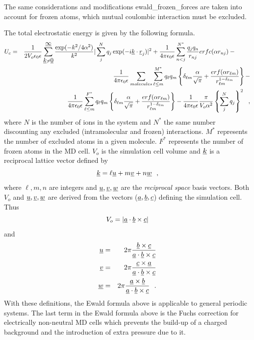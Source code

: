 The same considerations and modifications {\sc
ewald\_frozen\_forces} are taken into account for frozen atoms,
which mutual coulombic interaction must be excluded.

The total electrostatic energy is given by the following formula.
\begin{eqnarray}
U_{c}&=&\frac{1}{2V_{o} \epsilon_{0}\epsilon} \sum_{\mbox{$\underline{k}$} \neq
\mbox{$\underline{0}$}}^{\mbox{$\underline{\infty}$}} \frac{\exp(-k^{2}/4\alpha^{2})}{k^{2}}
|\sum_{j}^{N} q_{j}\exp(-i\mbox{$\underline{k}$}\cdot\mbox{$\underline{r}$}_{j})|^{2} +
\frac{1}{4\pi\epsilon_{0}\epsilon} \sum_{n<j}^{N^{*}} \frac{q_{j}q_{n}}
{r_{nj}} erfc(\alpha r_{nj}) - \phantom{xxxx} \nonumber \\
& & \frac{1}{4\pi\epsilon_{0}\epsilon} \sum_{molecules}
\sum_{\ell\le m}^{M^{*}} q_{\ell}q_{m} \left\{ \delta_{\ell m}
\frac{\alpha}{\sqrt{\pi}} + \frac{erf(\alpha r_{\ell m})}{r_{\ell
m}^{1-\delta_{\ell m}}} \right\} - \\
& & \frac{1}{4\pi\epsilon_{0}\epsilon} \sum_{\ell\le m}^{F^{*}}
q_{\ell}q_{m} \left\{ \delta_{\ell m} \frac{\alpha}{\sqrt{\pi}} +
\frac{erf(\alpha r_{\ell m})}{r_{\ell m}^{1-\delta_{\ell m}}}
\right\} - \frac{1}{4\pi\epsilon_{0}\epsilon} \frac{\pi}{V_{o} \alpha^{2}}
\left\{ \sum_{j}^{N} q_{j} \right\}^{2}~~, \nonumber
\end{eqnarray}
where $N$ is the number of ions in the system and $N^{*}$ the same
number discounting any excluded (intramolecular and frozen)
interactions.  $M^{*}$ represents the number of excluded atoms in
a given molecule.  $F^{*}$ represents the number of frozen atoms
in the MD cell.  $V_{o}$ is the simulation cell volume and
$\mbox{$\underline{k}$}$ is a reciprocal lattice vector defined by
\begin{equation}
\mbox{$\underline{k}$} = \ell \mbox{$\underline{u}$} + m \mbox{$\underline{v}$} + n \mbox{$\underline{w}$} \label{k-vector}~~,
\end{equation}
where $\ell,m,n$ are integers and $\mbox{$\underline{u}$},\mbox{$\underline{v}$},\mbox{$\underline{w}$}$ are
the {\em reciprocal space} basis vectors.  Both $V_{o}$ and
$\mbox{$\underline{u}$},\mbox{$\underline{v}$},\mbox{$\underline{w}$}$ are derived from the vectors
($\mbox{$\underline{a}$},\mbox{$\underline{b}$},\mbox{$\underline{c}$}$) defining the simulation cell.  Thus
\begin{equation}
V_{o} = |\mbox{$\underline{a}$} \cdot \mbox{$\underline{b}$} \times \mbox{$\underline{c}$}|
\end{equation}
and
\begin{eqnarray}
\mbox{$\underline{u}$} &=& 2 \pi \frac{\mbox{$\underline{b}$} \times \mbox{$\underline{c}$}}{\mbox{$\underline{a}$} \cdot \mbox{$\underline{b}$} \times \mbox{$\underline{c}$}} \nonumber \\
\mbox{$\underline{v}$} &=& 2 \pi \frac{\mbox{$\underline{c}$} \times \mbox{$\underline{a}$}}{\mbox{$\underline{a}$} \cdot \mbox{$\underline{b}$} \times\mbox{$\underline{c}$}} \\
\mbox{$\underline{w}$} &=& 2 \pi \frac{\mbox{$\underline{a}$} \times \mbox{$\underline{b}$}}{\mbox{$\underline{a}$} \cdot \mbox{$\underline{b}$} \times \mbox{$\underline{c}$}}~~. \nonumber
\end{eqnarray}
With these definitions, the Ewald formula above is applicable to
general periodic systems.  The last term in the Ewald formula above
is the Fuchs correction \cite{fuchs-35a} for electrically
non-neutral MD cells which prevents the build-up of a charged
background and the introduction of extra pressure due to it.

